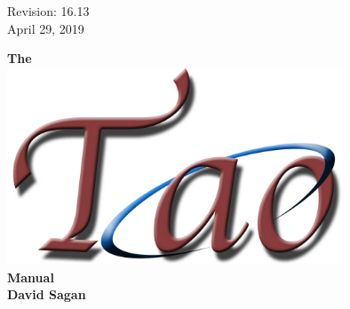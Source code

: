 \thispagestyle{empty}

\begin{flushright}
\large
Revision: 16.13 \\
April 29, 2019 \\
\end{flushright}

\vfill


{
\begin{center}
{\Huge \sf\bf The} \\
\vskip 0.1in
\includegraphics[width=10cm]{tao-logo.pdf} \\
\vskip 0.1in
{\Huge \sf\bf Manual} \\
\vskip 0.4in
{\huge \sf\bf David Sagan} \\
\end{center}
}

\vfill
\break
